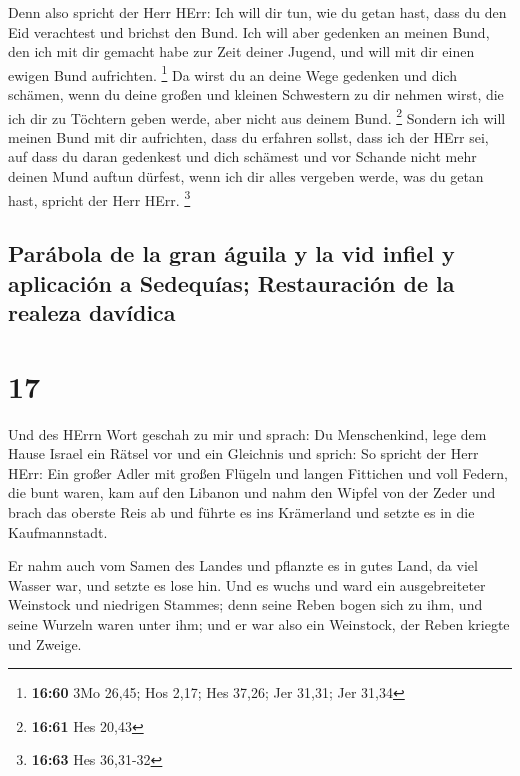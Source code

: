  Denn also spricht der Herr HErr: Ich will dir tun, wie
du getan hast, dass du den Eid verachtest und brichst den Bund.
 Ich will aber gedenken an meinen Bund, den ich mit dir
gemacht habe zur Zeit deiner Jugend, und will mit dir einen ewigen Bund
aufrichten. \footnote{\textbf{16:60} 3Mo 26,45; Hos 2,17; Hes 37,26; Jer
  31,31; Jer 31,34}  Da wirst du an deine Wege gedenken
und dich schämen, wenn du deine großen und kleinen Schwestern zu dir
nehmen wirst, die ich dir zu Töchtern geben werde, aber nicht aus deinem
Bund. \footnote{\textbf{16:61} Hes 20,43}  Sondern ich
will meinen Bund mit dir aufrichten, dass du erfahren sollst, dass ich
der HErr sei,  auf dass du daran gedenkest und dich
schämest und vor Schande nicht mehr deinen Mund auftun dürfest, wenn ich
dir alles vergeben werde, was du getan hast, spricht der Herr HErr.
\footnote{\textbf{16:63} Hes 36,31-32}

\hypertarget{paruxe1bola-de-la-gran-uxe1guila-y-la-vid-infiel-y-aplicaciuxf3n-a-sedequuxedas-restauraciuxf3n-de-la-realeza-davuxeddica}{%
\subsection{Parábola de la gran águila y la vid infiel y aplicación a
Sedequías; Restauración de la realeza
davídica}\label{paruxe1bola-de-la-gran-uxe1guila-y-la-vid-infiel-y-aplicaciuxf3n-a-sedequuxedas-restauraciuxf3n-de-la-realeza-davuxeddica}}

\hypertarget{section-16}{%
\section{17}\label{section-16}}

 Und des HErrn Wort geschah zu mir und sprach:
 Du Menschenkind, lege dem Hause Israel ein Rätsel vor und
ein Gleichnis  und sprich: So spricht der Herr HErr: Ein
großer Adler mit großen Flügeln und langen Fittichen und voll Federn,
die bunt waren, kam auf den Libanon und nahm den Wipfel von der Zeder
 und brach das oberste Reis ab und führte es ins
Krämerland und setzte es in die Kaufmannstadt.

 Er nahm auch vom Samen des Landes und pflanzte es in
gutes Land, da viel Wasser war, und setzte es lose hin. 
Und es wuchs und ward ein ausgebreiteter Weinstock und niedrigen
Stammes; denn seine Reben bogen sich zu ihm, und seine Wurzeln waren
unter ihm; und er war also ein Weinstock, der Reben kriegte und Zweige.


